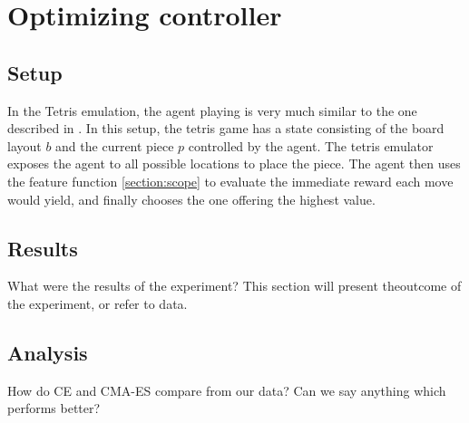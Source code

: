 \section{Optimizing controller}

\subsection{Setup}

In the Tetris emulation, the agent playing is 
very much similar to the one described in \citep{scherrer2015}.
In this setup, the tetris game has a state consisting of the 
board layout $b$ and the current piece $p$ controlled by the agent.
The tetris emulator \cite{mdptetris} exposes the agent to all 
possible locations to place the piece. The agent then uses the 
feature function \ref{section:scope} to evaluate the immediate
reward each move would yield, and finally chooses the one offering 
the highest value.

\subsection{Results}

What were the results of the experiment? This section will
present theoutcome of the experiment, or refer to data.

\subsection{Analysis}

How do CE and CMA-ES compare from our data? Can we say anything 
which performs better?

